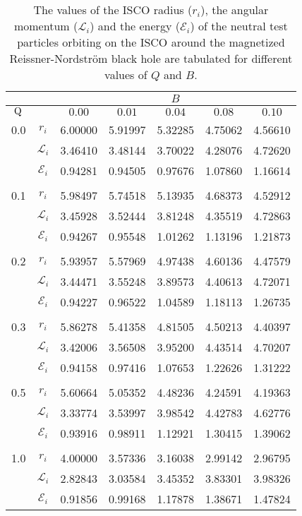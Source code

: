 \documentclass[showpacs,twocolumn,superscriptaddress]{revtex4}
\begin{document}
\begin{table}[h]
\caption{\label{1tab} The values of the ISCO radius ($r_{i}$), the angular momentum ($\mathcal{L}_{i}$) and the energy ($\mathcal{E}_{i}$) of the neutral test particles orbiting on the ISCO around the magnetized Reissner-Nordstr\"{o}m black hole are tabulated for different values of $Q$ and $B$. }
\begin{ruledtabular}
\begin{tabular}{c|cccccc}
 &  &  &  &  $B$ &  &   \\ \hline
{$\rm Q $} & & $0.00$ & $0.01$ &  $0.04$
& $0.08$ & $0.10$ \\
%
% 
\hline
 0.0 & $r_{i}$ & 6.00000 &5.91997 & 5.32285 & 4.75062 & 4.56610  \\
   & $\mathcal{L}_{i}$  & 3.46410 &3.48144 & 3.70022 & 4.28076 & 4.72620 \\
    & $\mathcal{E}_{i}$   & 0.94281 &0.94505 & 0.97676 & 1.07860 & 1.16614 \\\\
%
0.1  & $r_{i}$ &5.98497  &5.74518  &5.13935  &4.68373 &4.52912  \\
%
 & $\mathcal{L}_{i}$ &3.45928  &3.52444  &3.81248  &4.35519 &4.72863  \\
%
& $\mathcal{E}_{i}$ &0.94267  &0.95548  &1.01262  &1.13196 &1.21873  \\\\
%
0.2  &$r_{i}$  &5.93957  &5.57969 &4.97438 &4.60136 &4.47579  \\
%
 & $\mathcal{L}_{i}$  &3.44471  &3.55248 &3.89573 &4.40613 &4.72071  \\
%
& $\mathcal{E}_{i}$  &0.94227  &0.96522 &1.04589 &1.18113 &1.26735  \\\\
%
0.3  &$r_{i}$ &5.86278   &5.41358 &4.81505 &4.50213 &4.40397  \\
%
&$\mathcal{L}_{i}$  &3.42006   &3.56508 &3.95200 &4.43514 &4.70207  \\
%
&$\mathcal{E}_{i}$ &0.94158   &0.97416 &1.07653 &1.22626 &1.31222  \\\\
%
0.5 &$r_{i}$ &5.60664   &5.05352 &4.48236 &4.24591 &4.19363 \\
%
&$\mathcal{L}_{i}$ &3.33774   &3.53997 &3.98542 &4.42783 &4.62776 \\
%
&$\mathcal{E}_{i}$ &0.93916   &0.98911 &1.12921 &1.30415 &1.39062 \\\\
%
1.0 &$r_{i}$ &4.00000   &3.57336 &3.16038 &2.99142 & 2.96795 \\
%
&$\mathcal{L}_{i}$ &2.82843   &3.03584 &3.45352 &3.83301 & 3.98326 \\
%      
&$\mathcal{E}_{i}$ &0.91856   &0.99168 &1.17878 &1.38671 & 1.47824 \\
%
\end{tabular}
\end{ruledtabular}
\end{table}
\end{document}
